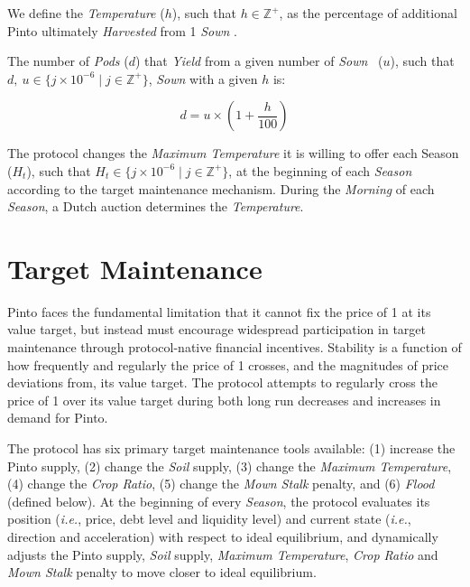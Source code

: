\documentclass[tikz]{article}
\makeatletter
\newenvironment{keepunit}{%
  \par\penalty0\begingroup
  \edef\keepunitparskip{\the\parskip}%
  \noindent\begin{minipage}[t]{\linewidth}%
  \setlength{\parskip}{\keepunitparskip}%
  \@minipagefalse
}{%
  \end{minipage}\par\endgroup
}
\newcommand{\term}[1]{\textsl{#1}}
\newcommand{\Pinto}{} %
\renewcommand{\Pinto}{\usebox{\cachePinto}}
\makeatother
\begin{document}
We define the \term{Temperature} ($h$), such that $h \in \mathbb{Z}^{+}$, as the percentage of additional Pinto ultimately \term{Harvested} from 1 \term{Sown} \Pinto.

\begin{keepunit}
The number of \term{Pods} ($d$) that \term{Yield} from a given number of \term{Sown} \Pinto\ ($u$), such that $d,\ u \in \{j \times 10^{-6} \mid j \in \mathbb{Z}^{+} \}$, \term{Sown} with a given $h$ is:

    $$
        d = u \times \left(1 + \frac{h}
                                {100}
                    \right)
    $$
\end{keepunit}

The protocol changes the \term{Maximum Temperature} it is willing to offer each Season ($H_{t}$), such that $H_{t} \in \{j \times 10^{-6} \mid j \in \mathbb{Z}^{+} \}$, at the beginning of each \term{Season} according to the target maintenance mechanism. During the \term{Morning} of each \term{Season}, a Dutch auction determines the \term{Temperature}.


\section{Target Maintenance}

Pinto faces the fundamental limitation that it cannot fix the price of \Pinto1 at its value target, but instead must encourage widespread participation in target maintenance through protocol-native financial incentives. Stability is a function of how frequently and regularly the price of \Pinto1 crosses, and the magnitudes of price deviations from, its value target. The protocol attempts to regularly cross the price of \Pinto1 over its value target during both long run decreases and increases in demand for Pinto.

The protocol has six primary target maintenance tools available: (1) increase the Pinto supply, (2) change the \term{Soil} supply, (3) change the \term{Maximum Temperature}, (4) change the \term{Crop Ratio}, (5) change the \term{Mown Stalk} penalty, and (6) \term{Flood} (defined below). At the beginning of every \term{Season}, the protocol evaluates its position (\textit{i.e.}, price, debt level and liquidity level) and current state (\textit{i.e.}, direction and acceleration) with respect to ideal equilibrium, and dynamically adjusts the Pinto supply, \term{Soil} supply, \term{Maximum Temperature}, \term{Crop Ratio} and \term{Mown Stalk} penalty to move closer to ideal equilibrium.
\end{document}
